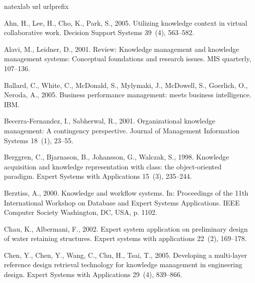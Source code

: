 \documentclass{elsarticle}
\begin{document}
{
% 
\begin{thebibliography}{37}
\expandafter\ifx\csname natexlab\endcsname\relax\def\natexlab#1{#1}\fi
\expandafter\ifx\csname url\endcsname\relax
  \def\url#1{\texttt{#1}}\fi
\expandafter\ifx\csname urlprefix\endcsname\relax\def\urlprefix{URL }\fi

Ahn, H., Lee, H., Cho, K., Park, S., 2005. {Utilizing knowledge context in
  virtual collaborative work}. Decision Support Systems 39~(4), 563--582.

Alavi, M., Leidner, D., 2001. {Review: Knowledge management and knowledge
  management systems: Conceptual foundations and research issues}. MIS
  quarterly, 107--136.

Ballard, C., White, C., McDonald, S., Mylymaki, J., McDowell, S., Goerlich, O.,
  Neroda, A., 2005. {Business performance management: meets business
  intelligence}. IBM.

Becerra-Fernandez, I., Sabherwal, R., 2001. {Organizational knowledge
  management: A contingency perspective}. Journal of Management Information
  Systems 18~(1), 23--55.

Berggren, C., Bjarnason, B., Johansson, G., Walczak, S., 1998. {Knowledge
  acquisition and knowledge representation with class: the object-oriented
  paradigm}. Expert Systems with Applications 15~(3), 235--244.

Berztiss, A., 2000. {Knowledge and workflow systems}. In: Proceedings of the
  11th International Workshop on Database and Expert Systems Applications. IEEE
  Computer Society Washington, DC, USA, p. 1102.

Chau, K., Albermani, F., 2002. {Expert system application on preliminary design
  of water retaining structures}. Expert systems with applications 22~(2),
  169--178.

Chen, Y., Chen, Y., Wang, C., Chu, H., Tsai, T., 2005. {Developing a
  multi-layer reference design retrieval technology for knowledge management in
  engineering design}. Expert Systems with Applications 29~(4), 839--866.


\end{thebibliography}}
\end{document}
